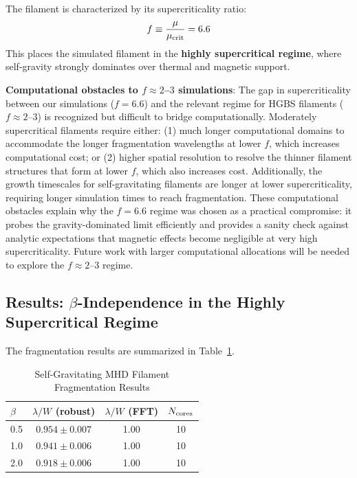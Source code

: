\documentclass[11pt,a4paper]{article}
\begin{document}
The filament is characterized by its supercriticality ratio:
\begin{equation}
f \equiv \frac{\mu}{\mu_{\rm crit}} = 6.6
\end{equation}
This places the simulated filament in the \textbf{highly supercritical regime}, where self-gravity strongly dominates over thermal and magnetic support.

\textbf{Computational obstacles to $f \approx 2$--$3$ simulations}: The gap in supercriticality between our simulations ($f = 6.6$) and the relevant regime for HGBS filaments ($f \approx 2$--$3$) is recognized but difficult to bridge computationally. Moderately supercritical filaments require either: (1) much longer computational domains to accommodate the longer fragmentation wavelengths at lower $f$, which increases computational cost; or (2) higher spatial resolution to resolve the thinner filament structures that form at lower $f$, which also increases cost. Additionally, the growth timescales for self-gravitating filaments are longer at lower supercriticality, requiring longer simulation times to reach fragmentation. These computational obstacles explain why the $f = 6.6$ regime was chosen as a practical compromise: it probes the gravity-dominated limit efficiently and provides a sanity check against analytic expectations that magnetic effects become negligible at very high supercriticality. Future work with larger computational allocations will be needed to explore the $f \approx 2$--$3$ regime.

\subsection{Results: $\beta$-Independence in the Highly Supercritical Regime}

The fragmentation results are summarized in Table~\ref{tab:mhd_sg}.

\begin{table}[H]
\centering
\caption{Self-Gravitating MHD Filament Fragmentation Results}
\label{tab:mhd_sg}
\begin{tabular}{lccc}
\toprule
$\beta$ & $\lambda/W$ (robust) & $\lambda/W$ (FFT) & $N_{\rm cores}$ \\
\midrule
0.5 & $0.954 \pm 0.007$ & 1.00 & 10 \\
1.0 & $0.941 \pm 0.006$ & 1.00 & 10 \\
2.0 & $0.918 \pm 0.006$ & 1.00 & 10 \\
\bottomrule
\end{tabular}
\end{table}
\end{document}
